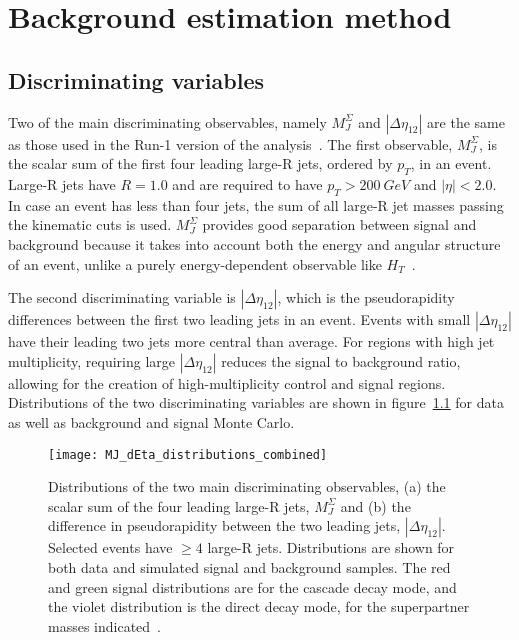 \chapter{Background estimation method}\label{ch:background_method}

\section{Discriminating variables}\label{sec:variables}
Two of the main discriminating observables, namely $M_J^{\Sigma}$ and $|\Delta\eta_{12}|$ are the same as those used in the Run-1 version of the analysis~\cite{run1-multijet}.
The first observable, $M_J^{\Sigma}$, is the scalar sum of the first four leading large-R jets, ordered by $p_{T}$, in an event.
Large-R jets have $R=1.0$ and are required to have $p_{T} > 200~GeV$ and $|\eta|<2.0$.
In case an event has less than four jets, the sum of all large-R jet masses passing the kinematic cuts is used.
$M_{J}^{\Sigma}$ provides good separation between signal and background because it takes into account both the energy and angular structure of an event, unlike a purely energy-dependent observable like $H_{T}$~\cite{hook-mj,elhedri-mj}.

The second discriminating variable is $|\Delta \eta_{12}|$, which is the pseudorapidity differences between the first two leading jets in an event.
Events with small $|\Delta \eta_{12}|$ have their leading two jets more central than average.
For regions with high jet multiplicity, requiring large $|\Delta \eta_{12}|$ reduces the signal to background ratio, allowing for the creation of high-multiplicity control and signal regions.
Distributions of the two discriminating variables are shown in figure~\ref{fig:MJ_dEta_distributions} for data as well as background and signal Monte Carlo.

\begin{figure}[!ht]
    \texttt{[image: MJ\_dEta\_distributions\_combined]}
    \caption{Distributions of the two main discriminating observables, (a) the scalar sum of the four leading large-R jets, $M_{J}^{\Sigma}$ and (b) the difference in pseudorapidity between the two leading jets, $|\Delta\eta_{12}|$.
    Selected events have $\geq 4$ large-R jets.
    Distributions are shown for both data and simulated signal and background samples.
    The red and green signal distributions are for the cascade decay mode, and the violet distribution is the direct decay mode, for the superpartner masses indicated~\cite{paper-plb}.}
    \label{fig:MJ_dEta_distributions}
\end{figure}

